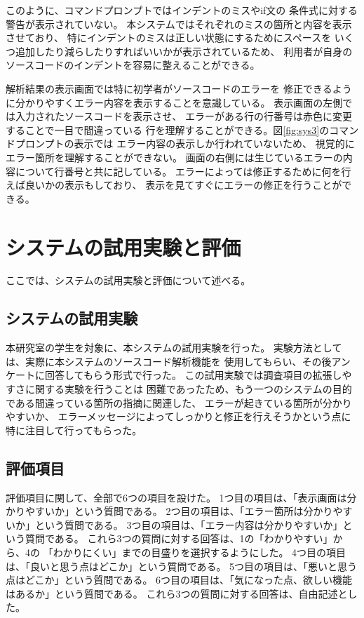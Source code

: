 \documentclass{csspaper}
\begin{document}
      このように、コマンドプロンプトではインデントのミスやif文の
      条件式に対する警告が表示されていない。
      本システムではそれぞれのミスの箇所と内容を表示させており、
      特にインデントのミスは正しい状態にするためにスペースを
      いくつ追加したり減らしたりすればいいかが表示されているため、
      利用者が自身のソースコードのインデントを容易に整えることができる。

      解析結果の表示画面では特に初学者がソースコードのエラーを
      修正できるように分かりやすくエラー内容を表示することを意識している。
      表示画面の左側では入力されたソースコードを表示させ、
      エラーがある行の行番号は赤色に変更することで一目で間違っている
      行を理解することができる。図\ref{fig:sys3}のコマンドプロンプトの表示では
      エラー内容の表示しか行われていないため、
      視覚的にエラー箇所を理解することができない。
      画面の右側には生じているエラーの内容について行番号と共に記している。
      エラーによっては修正するために何を行えば良いかの表示もしており、
      表示を見てすぐにエラーの修正を行うことができる。

   \chapter{システムの試用実験と評価}
   ここでは、システムの試用実験と評価について述べる。

      \section{システムの試用実験}
      本研究室の学生を対象に、本システムの試用実験を行った。
      実験方法としては、実際に本システムのソースコード解析機能を
      使用してもらい、その後アンケートに回答してもらう形式で行った。
      この試用実験では調査項目の拡張しやすさに関する実験を行うことは
      困難であったため、もう一つのシステムの目的である間違っている箇所の指摘に関連した、
      エラーが起きている箇所が分かりやすいか、
      エラーメッセージによってしっかりと修正を行えそうかという点に
      特に注目して行ってもらった。

      \section{評価項目}
      評価項目に関して、全部で6つの項目を設けた。
      1つ目の項目は、「表示画面は分かりやすいか」という質問である。
      2つ目の項目は、「エラー箇所は分かりやすいか」という質問である。
      3つ目の項目は、「エラー内容は分かりやすいか」という質問である。
      これら3つの質問に対する回答は、1の「わかりやすい」から、4の
      「わかりにくい」までの目盛りを選択するようにした。
      4つ目の項目は、「良いと思う点はどこか」という質問である。
      5つ目の項目は、「悪いと思う点はどこか」という質問である。
      6つ目の項目は、「気になった点、欲しい機能はあるか」という質問である。
      これら3つの質問に対する回答は、自由記述とした。
\end{document}
